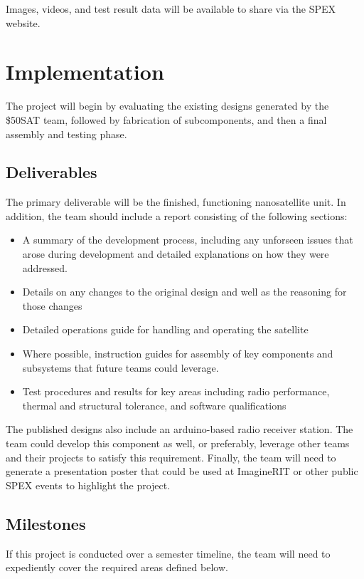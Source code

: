 \documentclass[conference]{IEEEtran} %
\begin{document}
Images, videos, and test result data will be available to share via the SPEX website.

\section{Implementation}
\label{sec:implementation}
The project will begin by evaluating the existing designs generated by the \$50SAT team, followed by fabrication of subcomponents, and then a final assembly and testing phase.

\subsection{Deliverables}
\label{subsec:deliverables}

The primary deliverable will be the finished, functioning nanosatellite unit.
In addition, the team should include a report consisting of the following sections:
\begin{itemize}
  \item A summary of the development process, including any unforseen issues that arose during development and detailed explanations on how they were addressed.
  \item Details on any changes to the original design and well as the reasoning for those changes
  \item Detailed operations guide for handling and operating the satellite
  \item Where possible, instruction guides for assembly of key components and subsystems that future teams could leverage.
  \item Test procedures and results for key areas including radio performance, thermal and structural tolerance, and software qualifications
\end{itemize}
The published designs also include an arduino-based radio receiver station. The team could develop this component as well, or preferably, leverage other teams and their projects to satisfy this requirement.
Finally, the team will need to generate a presentation poster that could be used at ImagineRIT or other public SPEX events to highlight the project.

\subsection{Milestones}
\label{subsec:milestones}
If this project is conducted over a semester timeline, the team will need to expediently cover the required areas defined below.
\end{document}
